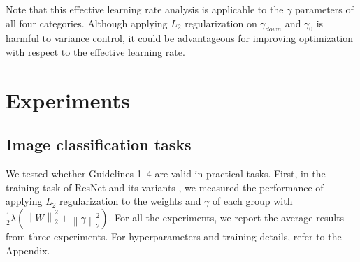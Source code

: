 \documentclass{article}
\begin{document}
Note that this effective learning rate analysis is applicable to the $\gamma$ parameters of all four categories. Although applying $L_2$ regularization on $\gamma_{down}$ and $\gamma_{0}$ is harmful to variance control, it could be advantageous for improving optimization with respect to the effective learning rate.

\section{Experiments}
\label{sec:experiments}

\subsection{Image classification tasks}
We tested whether Guidelines 1--4 are valid in practical tasks. First, in the training task of ResNet and its variants \cite{gcvpr/HeZRS16,geccv/HeZRS16,gbmvc/ZagoruykoK16,gcvpr/XieGDTH17}, we measured the performance of applying $L_2$ regularization to the weights and $\gamma$ of each group with $\frac{1}{2} \lambda (\left\lVert W \right\rVert^2_2 + \left\lVert \gamma \right\rVert^2_2)$. For all the experiments, we report the average results from three experiments. For hyperparameters and training details, refer to the Appendix.
\end{document}
